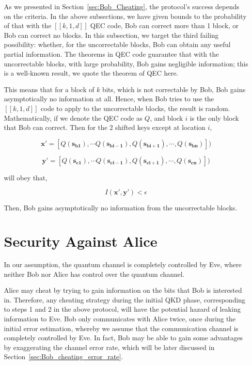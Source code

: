 \documentclass[%
 reprint,
superscriptaddress,
 amsmath,amssymb,
 aps,
]{revtex4-2}
\begin{document}
As we presented in Section~\ref{sec:Bob_Cheating}, the protocol's success depends on the criteria. In the above subsections, we have given bounds to the probability of that with the $[[k, 1, d]]$ QEC code, Bob can correct more than 1 block, or Bob can correct no blocks. In this subsection, we target the third failing possibility: whether, for the uncorrectable blocks, Bob can obtain any useful partial information. The theorems in QEC code guarantee that with the uncorrectable blocks, with large probability, Bob gains negligible information; this is a well-known result, we quote the theorem of QEC here.

This means that for a block of $k$ bits, which is not correctable by Bob, Bob gains asymptotically no information at all. Hence, when Bob tries to use the $[[k, 1, d]]$ code to apply to the uncorrectable blocks, the result is random. Mathematically, if we denote the QEC code as $Q$, and block $i$ is the only block that Bob can correct. Then for the 2 shifted keys except at location $i$,

\begin{equation}
    \mathbf{x'}=[Q(\mathbf{s_{b1}}), \cdots Q(\mathbf{s_{bi-1}}), Q(\mathbf{s_{bi+1}}), \cdots, Q(\mathbf{s_{bn}}) ])
\end{equation}

\begin{equation}
    \mathbf{y'}=[Q(\mathbf{s_{c1}}), \cdots Q(\mathbf{s_{ci-1}}), Q(\mathbf{s_{ci+1}}), \cdots, Q(\mathbf{s_{cn}}) ])
\end{equation}

will obey that,

\begin{equation}
    I(\mathbf{x'}, \mathbf{y'})<\epsilon
\end{equation}

Then, Bob gains asymptotically no information from the uncorrectable blocks.


\section{Security Against Alice}

In our assumption, the quantum channel is completely controlled by Eve, where neither Bob nor Alice has control over the quantum channel.

Alice may cheat by trying to gain information on the bits that Bob is interested in. Therefore, any cheating strategy during the initial QKD phase, corresponding to steps 1 and 2 in the above protocol, will have the potential hazard of leaking information to Eve. Bob only communicates with Alice twice, once during the initial error estimation, whereby we assume that the communication channel is completely controlled by Eve. In fact, Bob may be able to gain some advantages by exaggerating the channel error rate, which will be later discussed in Section~\ref{sec:Bob_cheating_error_rate}. 
\end{document}
